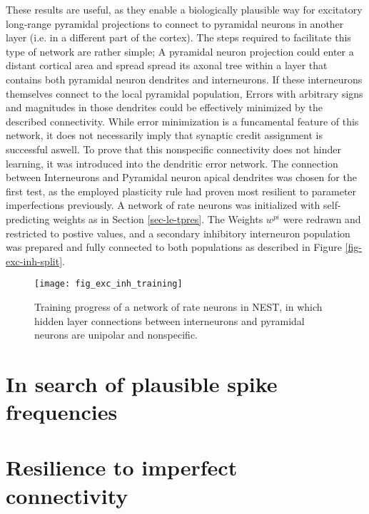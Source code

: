These results are useful, as they enable a biologically plausible way for excitatory long-range pyramidal projections to
connect to pyramidal neurons in another layer (i.e. in a different part of the cortex). The steps required to facilitate
this type of network are rather simple; A pyramidal neuron projection could enter a distant cortical area and spread
spread its axonal tree \phrasing within a layer that contains both pyramidal neuron dendrites and interneurons. If these
interneurons themselves connect to the local pyramidal population, Errors with arbitrary signs and magnitudes in those
dendrites could be effectively minimized by the described connectivity. While error minimization is a funcamental
feature of this network, it does not necessarily imply that synaptic credit assignment is successful aswell. To prove
that this nonspecific connectivity does not hinder learning, it was introduced into the dendritic error network. The
connection between Interneurons and Pyramidal neuron apical dendrites was chosen for the first test, as the employed
plasticity rule had proven most resilient to parameter imperfections previously. A network of rate neurons was
initialized with self-predicting weights as in Section \ref{sec-le-tpres}. The Weights $w^{pi}$ were redrawn and
restricted to postive values, and a secondary inhibitory interneuron population was prepared and fully connected to both
populations as described in Figure \ref{fig-exc-inh-split}. 


\begin{figure}[t]
    \centering
    \texttt{[image: fig\_exc\_inh\_training]}
    \caption{Training progress of a network of rate neurons in NEST, in which hidden layer connections between
    interneurons and pyramidal neurons are unipolar and nonspecific.}
    \label{fig-exc-inh-training}
\end{figure}


\section{In search of plausible spike frequencies}


\section{Resilience to imperfect connectivity}

